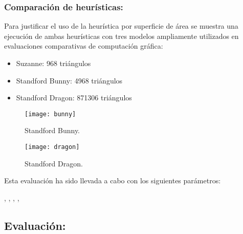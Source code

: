 	
\subsubsection{Comparación de heurísticas:}
	
Para justificar el uso de la heurística por superficie de área se muestra una ejecución de ambas heurísticas con tres modelos ampliamente utilizados en evaluaciones comparativas de computación gráfica:

\begin{itemize}
	
	\item Suzanne: 968 triángulos
	\item Standford Bunny: 4968 triángulos
	\item Standford Dragon: 871306 triángulos
	
\end{itemize}

\begin{figure}[H]
	\centering
  \begin{minipage}[b]{0.4\textwidth}
    \texttt{[image: bunny]}
    \caption{Standford Bunny.}
  \end{minipage}
  \hfill
  \begin{minipage}[b]{0.4\textwidth}
    \texttt{[image: dragon]}
    \caption{Standford Dragon.}
  \end{minipage}
\end{figure}

Esta evaluación ha sido llevada a cabo con los siguientes parámetros:

, , , , 

	
\subsection{Evaluación:}
	
